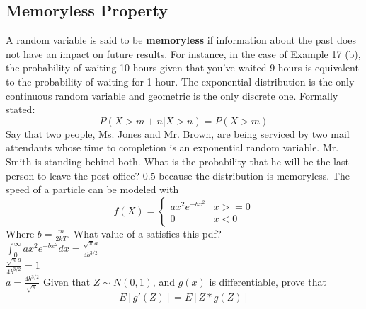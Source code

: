 \documentclass[11pt]{article}
\theoremstyle{definition}
\begin{document}
\subsection{Memoryless Property}
A random variable is said to be {\bf memoryless} if information about the past does not have an impact on future results. For instance, in the case of Example 17 (b), the probability of waiting 10 hours given that you've waited 9 hours is equivalent to the probability of waiting for 1 hour. The exponential distribution is the only continuous random variable and geometric is the only discrete one. Formally stated:\\
$$P(X > m + n | X > n) = P(X > m)$$
\example Say that two people, Ms. Jones and Mr. Brown, are being serviced by two mail attendants whose time to completion is an exponential random variable. Mr. Smith is standing behind both. What is the probability that he will be the last person to leave the post office? 0.5 because the distribution is memoryless. 
\example The speed of a particle can be modeled with \begin{equation*} f(X) =	 \begin{cases}
								a x^2 e^{-b x^2} & x >= 0\\
								0 & x < 0
							\end{cases}
		\end{equation*}
		Where $b = \frac{m}{2kT}$. What value of a satisfies this pdf?\\
		$\int_{0}^{\infty} a x^2 e^{-b x^2} dx = \frac{\sqrt{\pi } a}{4 b^{3/2}} $\\
		$\frac{\sqrt{\pi } a}{4 b^{3/2}} = 1$\\
		$a = \frac{4 b^{3/2}}{\sqrt{\pi }}$
\example Given that $Z \sim N(0,1)$, and $g(x)$ is differentiable, prove that
$$E[g'(Z)] = E[Z * g(Z)]$$
		
\end{document}

